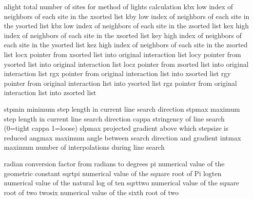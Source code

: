 \documentclass[letterpaper,11pt,english]{sphinxmanual}
\begin{document}

\begin{sphinxVerbatim}[commandchars=\\\{\}]
nlight          total number of sites for method of lights calculation
kbx             low index of neighbors of each site in the x\PYGZhy{}sorted list
kby             low index of neighbors of each site in the y\PYGZhy{}sorted list
kbz             low index of neighbors of each site in the z\PYGZhy{}sorted list
kex             high index of neighbors of each site in the x\PYGZhy{}sorted list
key             high index of neighbors of each site in the y\PYGZhy{}sorted list
kez             high index of neighbors of each site in the z\PYGZhy{}sorted list
locx            pointer from x\PYGZhy{}sorted list into original interaction list
locy            pointer from y\PYGZhy{}sorted list into original interaction list
locz            pointer from z\PYGZhy{}sorted list into original interaction list
rgx             pointer from original interaction list into x\PYGZhy{}sorted list
rgy             pointer from original interaction list into y\PYGZhy{}sorted list
rgz             pointer from original interaction list into z\PYGZhy{}sorted list
\end{sphinxVerbatim}


\begin{sphinxVerbatim}[commandchars=\\\{\}]
stpmin          minimum step length in current line search direction
stpmax          maximum step length in current line search direction
cappa           stringency of line search (0=tight \PYGZlt{} cappa \PYGZlt{} 1=loose)
slpmax          projected gradient above which stepsize is reduced
angmax          maximum angle between search direction and \PYGZhy{}gradient
intmax          maximum number of interpolations during line search
\end{sphinxVerbatim}


\begin{sphinxVerbatim}[commandchars=\\\{\}]
radian          conversion factor from radians to degrees
pi              numerical value of the geometric constant
sqrtpi          numerical value of the square root of Pi
logten          numerical value of the natural log of ten
sqrttwo         numerical value of the square root of two
twosix          numerical value of the sixth root of two
\end{sphinxVerbatim}
\end{document}
